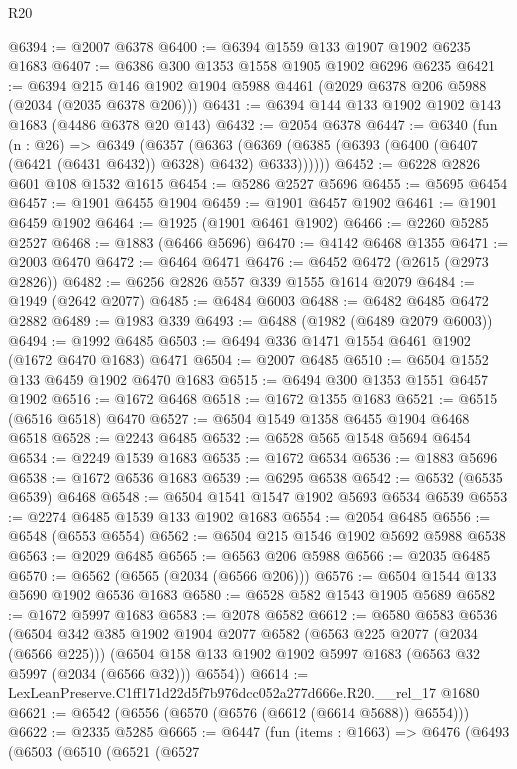 \begin{lexlean}{R20}
\begin{coremodule}
@6394 := @2007 @6378
@6400 := @6394 @1559 @133 @1907 @1902 @6235 @1683
@6407 := @6386 @300 @1353 @1558 @1905 @1902 @6296 @6235
@6421 := @6394 @215 @146 @1902 @1904 @5988 @4461 (@2029 @6378 @206 @5988 (@2034 (@2035 @6378 @206)))
@6431 := @6394 @144 @133 @1902 @1902 @143 @1683 (@4486 @6378 @20 @143)
@6432 := @2054 @6378
@6447 := @6340
    (fun (n : @26) =>
    @6349
      (@6357
        (@6363 (@6369 (@6385 (@6393 (@6400 (@6407 (@6421 (@6431 @6432)) @6328) @6432) @6333))))))
@6452 := @6228 @2826 @601 @108 @1532 @1615
@6454 := @5286 @2527 @5696
@6455 := @5695 @6454
@6457 := @1901 @6455 @1904
@6459 := @1901 @6457 @1902
@6461 := @1901 @6459 @1902
@6464 := @1925 (@1901 @6461 @1902)
@6466 := @2260 @5285 @2527
@6468 := @1883 (@6466 @5696)
@6470 := @4142 @6468 @1355
@6471 := @2003 @6470
@6472 := @6464 @6471
@6476 := @6452 @6472 (@2615 (@2973 @2826))
@6482 := @6256 @2826 @557 @339 @1555 @1614 @2079
@6484 := @1949 (@2642 @2077)
@6485 := @6484 @6003
@6488 := @6482 @6485 @6472 @2882
@6489 := @1983 @339
@6493 := @6488 (@1982 (@6489 @2079 @6003))
@6494 := @1992 @6485
@6503 := @6494 @336 @1471 @1554 @6461 @1902 (@1672 @6470 @1683) @6471
@6504 := @2007 @6485
@6510 := @6504 @1552 @133 @6459 @1902 @6470 @1683
@6515 := @6494 @300 @1353 @1551 @6457 @1902
@6516 := @1672 @6468
@6518 := @1672 @1355 @1683
@6521 := @6515 (@6516 @6518) @6470
@6527 := @6504 @1549 @1358 @6455 @1904 @6468 @6518
@6528 := @2243 @6485
@6532 := @6528 @565 @1548 @5694 @6454
@6534 := @2249 @1539 @1683
@6535 := @1672 @6534
@6536 := @1883 @5696
@6538 := @1672 @6536 @1683
@6539 := @6295 @6538
@6542 := @6532 (@6535 @6539) @6468
@6548 := @6504 @1541 @1547 @1902 @5693 @6534 @6539
@6553 := @2274 @6485 @1539 @133 @1902 @1683
@6554 := @2054 @6485
@6556 := @6548 (@6553 @6554)
@6562 := @6504 @215 @1546 @1902 @5692 @5988 @6538
@6563 := @2029 @6485
@6565 := @6563 @206 @5988
@6566 := @2035 @6485
@6570 := @6562 (@6565 (@2034 (@6566 @206)))
@6576 := @6504 @1544 @133 @5690 @1902 @6536 @1683
@6580 := @6528 @582 @1543 @1905 @5689
@6582 := @1672 @5997 @1683
@6583 := @2078 @6582
@6612 := @6580
    @6583
    @6536
    (@6504
      @342
      @385
      @1902
      @1904
      @2077
      @6582
      (@6563 @225 @2077 (@2034 (@6566 @225)))
      (@6504 @158 @133 @1902 @1902 @5997 @1683 (@6563 @32 @5997 (@2034 (@6566 @32))) @6554))
@6614 := LexLeanPreserve.C1ff171d22d5f7b976dcc052a277d666e.R20.__rel_17 @1680
@6621 := @6542 (@6556 (@6570 (@6576 (@6612 (@6614 @5688)) @6554)))
@6622 := @2335 @5285
@6665 := @6447
    (fun (items : @1663) =>
    @6476
      (@6493
        (@6503
          (@6510
            (@6521
              (@6527

\end{coremodule}
\end{lexlean}
